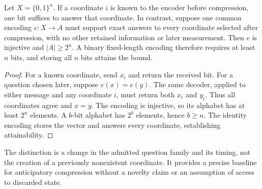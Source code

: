 \begin{theorem}
\label{thm:query-timing}
Let $X=\{0,1\}^n$. If a coordinate $i$ is known to the encoder before
compression, one bit suffices to answer that coordinate. In contrast,
suppose one common encoding $e:X\to A$ must support exact answers to
every coordinate selected after compression, with no other retained
information or later measurement. Then $e$ is injective and
$|A|\ge2^n$. A binary fixed-length encoding therefore requires at
least $n$ bits, and storing all $n$ bits attains the bound.
\end{theorem}
\begin{proof}
For a known coordinate, send $x_i$ and return the received bit. For a
question chosen later, suppose $e(x)=e(y)$. The same decoder, applied
to either message and any coordinate $i$, must return both $x_i$ and
$y_i$. Thus all coordinates agree and $x=y$. The encoding is injective,
so its alphabet has at least $2^n$ elements. A $b$-bit alphabet has
$2^b$ elements, hence $b\ge n$. The identity encoding stores the vector
and answers every coordinate, establishing attainability.
\end{proof}
The distinction is a change in the admitted question family and its
timing, not the creation of a previously nonexistent coordinate. It
provides a precise baseline for anticipatory compression without a
novelty claim or an assumption of access to discarded state.
